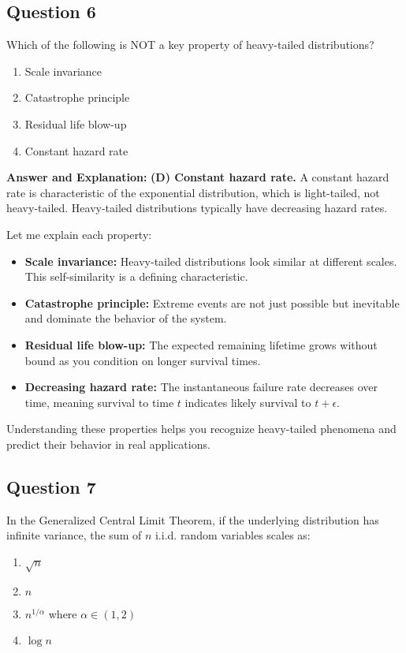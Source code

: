 \documentclass[11pt]{article}
\newenvironment{answer}{\color{answercolor}\begin{framed}\textbf{Answer and Explanation:}}{\end{framed}}
\begin{document}
\subsection{Question 6}
Which of the following is NOT a key property of heavy-tailed distributions?

\begin{enumerate}[label=(\Alph*)]
    \item Scale invariance
    \item Catastrophe principle  
    \item Residual life blow-up
    \item Constant hazard rate
\end{enumerate}

\begin{answer}
\textbf{(D) Constant hazard rate.} A constant hazard rate is characteristic of the exponential distribution, which is light-tailed, not heavy-tailed. Heavy-tailed distributions typically have decreasing hazard rates.

Let me explain each property:
\begin{itemize}
    \item \textbf{Scale invariance:} Heavy-tailed distributions look similar at different scales. This self-similarity is a defining characteristic.
    \item \textbf{Catastrophe principle:} Extreme events are not just possible but inevitable and dominate the behavior of the system.
    \item \textbf{Residual life blow-up:} The expected remaining lifetime grows without bound as you condition on longer survival times.
    \item \textbf{Decreasing hazard rate:} The instantaneous failure rate decreases over time, meaning survival to time $t$ indicates likely survival to $t + \epsilon$.
\end{itemize}

Understanding these properties helps you recognize heavy-tailed phenomena and predict their behavior in real applications.
\end{answer}

\subsection{Question 7}
In the Generalized Central Limit Theorem, if the underlying distribution has infinite variance, the sum of $n$ i.i.d. random variables scales as:

\begin{enumerate}[label=(\Alph*)]
    \item $\sqrt{n}$
    \item $n$
    \item $n^{1/\alpha}$ where $\alpha \in (1, 2)$
    \item $\log n$
\end{enumerate}
\end{document}
